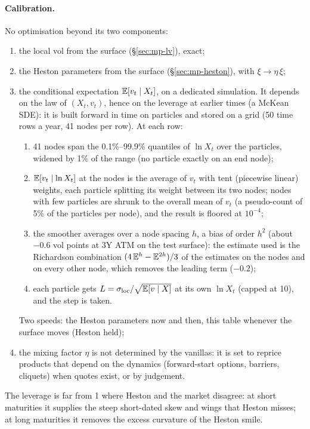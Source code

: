 \paragraph{Calibration.} No optimisation beyond its two components:
\begin{enumerate}[nosep]
  \item the local vol from the surface (\S\ref{sec:mp-lv}), exact;
  \item the Heston parameters from the surface (\S\ref{sec:mp-heston}), with $\xi \to \eta\,\xi$;
  \item the conditional expectation $\mathbb{E}[v_t \mid X_t]$, on a dedicated simulation. It depends on the law of $(X_t, v_t)$, hence
        on the leverage at earlier times (a McKean SDE): it is built forward in time on particles
        \citep[particle method,][]{guyon2012} and stored on a grid (50 time rows a year, 41 nodes per row). At each row:
        \begin{enumerate}[nosep]
          \item 41 nodes span the 0.1\%--99.9\% quantiles of $\ln X_t$ over the particles, widened by 1\% of the range (no
                particle exactly on an end node);
          \item $\mathbb{E}[v_t \mid \ln X_t]$ at the nodes is the average of $v_t$ with tent (piecewise linear) weights, each particle
                splitting its weight between its two nodes; nodes with few particles are shrunk to the overall mean of
                $v_t$ (a pseudo-count of 5\% of the particles per node), and the result is floored at $10^{-4}$;
          \item the smoother averages over a node spacing $h$, a bias of order $h^2$ (about $-0.6$ vol points at 3Y ATM
                on the test surface): the estimate used is the Richardson combination $(4\,\mathbb{E}^{h} - \mathbb{E}^{2h})/3$ of the
                estimates on the nodes and on every other node, which removes the leading term ($-0.2$);
          \item each particle gets $L = \sigma_{\mathrm{loc}}/\sqrt{\mathbb{E}[v \mid X]}$ at its own $\ln X_t$ (capped at 10), and the step is taken.
        \end{enumerate}
        Two speeds: the Heston parameters now and then, this table whenever the surface moves (Heston held);
  \item the mixing factor $\eta$ is not determined by the vanillas: it is set to reprice products that depend on the
        dynamics (forward-start options, barriers, cliquets) when quotes exist, or by judgement.
\end{enumerate}
The leverage is far from 1 where Heston and the market disagree: at short maturities it supplies the steep short-dated
skew and wings that Heston misses; at long maturities it removes the excess curvature of the Heston smile.

